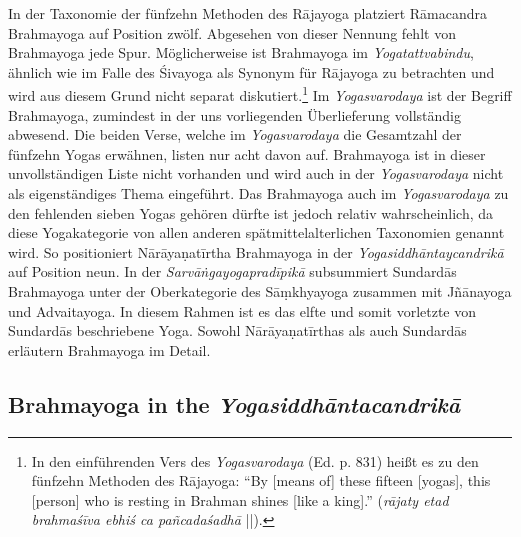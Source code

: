In der Taxonomie der fünfzehn Methoden des Rājayoga platziert Rāmacandra Brahmayoga auf Position zwölf. Abgesehen von dieser Nennung fehlt von Brahmayoga jede Spur. Möglicherweise ist Brahmayoga im \emph{Yogatattvabindu}, ähnlich wie im Falle des Śivayoga als Synonym für Rājayoga zu betrachten und wird aus diesem Grund nicht separat diskutiert.\footnote{In den einführenden Vers des \emph{Yogasvarodaya} (Ed. p. 831) heißt es zu den fünfzehn Methoden des Rājayoga: ``By [means of] these fifteen [yogas], this [person] who is resting in Brahman shines [like a king].'' (\textit{rājaty etad brahmaśīva ebhiś ca pañcadaśadhā} ||).} Im \textit{Yogasvarodaya} ist der Begriff Brahmayoga, zumindest in der uns vorliegenden Überlieferung vollständig abwesend. Die beiden Verse, welche im \textit{Yogasvarodaya} die Gesamtzahl der fünfzehn Yogas erwähnen, listen nur acht davon auf. Brahmayoga ist in dieser unvollständigen Liste nicht vorhanden und wird auch in der \textit{Yogasvarodaya} nicht als eigenständiges Thema eingeführt. Das Brahmayoga auch im \textit{Yogasvarodaya} zu den fehlenden sieben Yogas gehören dürfte ist jedoch relativ wahrscheinlich, da diese Yogakategorie von allen anderen spätmittelalterlichen Taxonomien genannt wird. So positioniert Nārāyaṇatīrtha Brahmayoga in der \textit{Yogasiddhāntaycandrikā} auf Position neun. In der \textit{Sarvāṅgayogapradīpikā} subsummiert Sundardās Brahmayoga unter der Oberkategorie des Sāṃkhyayoga zusammen mit Jñānayoga und Advaitayoga. In diesem Rahmen ist es das elfte und somit vorletzte von Sundardās beschriebene Yoga. Sowohl Nārāyaṇatīrthas als auch Sundardās erläutern Brahmayoga im Detail. 

\subsection{Brahmayoga in the \textit{Yogasiddhāntacandrikā}}

